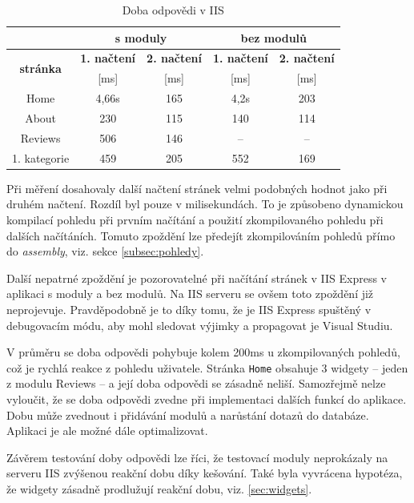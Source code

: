 \documentclass[11pt,twoside,a4paper]{book}
\begin{document}
\begin{table}[h!]
\centering
\begin{tabular}[c]{|c||c|c||c|c|}
\hline
 & \multicolumn{2}{c||}{\textbf{s moduly}} & \multicolumn{2}{|c|}{\textbf{bez modulů}} \\
\hline 
\multirow{2}{*}{\textbf{stránka}} & \textbf{1. načtení} & \textbf{2. načtení} & \textbf{1. načtení} & \textbf{2. načtení} \\ 
& [ms] & [ms] & [ms] & [ms] \\
\hline 
Home         & 4,66s  & 165 & 4,2s & 203 \\ 
\hline 
About        & 230  & 115 & 140 & 114 \\ 
\hline 
Reviews      & 506  & 146 & -- & -- \\ 
\hline 
1. kategorie & 459  & 205 & 552 & 169 \\ 
\hline 
\end{tabular}
\caption{Doba odpovědi v IIS}
\label{tab:testIIS}
\end{table} 

Při měření dosahovaly další načtení stránek velmi podobných hodnot jako při druhém načtení. Rozdíl byl pouze v milisekundách. To je způsobeno dynamickou kompilací pohledu při prvním načítání a použití zkompilovaného pohledu při dalších načítáních. Tomuto zpoždění lze předejít zkompilováním pohledů přímo do \textit{assembly}, viz. sekce \ref{subsec:pohledy}.

Další nepatrné zpoždění je pozorovatelné při načítání stránek v IIS Express v aplikaci s moduly a bez modulů. Na IIS serveru se ovšem toto zpoždění již neprojevuje. Pravděpodobně je to díky tomu, že je IIS Express spuštěný v debugovacím módu, aby mohl sledovat výjimky a propagovat je Visual Studiu. 

V průměru se doba odpovědi pohybuje kolem 200ms u zkompilovaných pohledů, což je rychlá reakce z pohledu uživatele. Stránka \texttt{Home} obsahuje 3 widgety -- jeden z modulu \textsf{Reviews} -- a její doba odpovědi se zásadně neliší. Samozřejmě nelze vyloučit, že se doba odpovědi zvedne při implementaci dalších funkcí do aplikace. Dobu může zvednout i přidávání modulů a narůstání dotazů do databáze. Aplikaci je ale možné dále optimalizovat. 

Závěrem testování doby odpovědi lze říci, že testovací moduly neprokázaly na serveru IIS zvýšenou reakční dobu díky kešování. Také byla vyvrácena hypotéza, že widgety zásadně prodlužují reakční dobu, viz. \ref{sec:widgets}.
\end{document}
